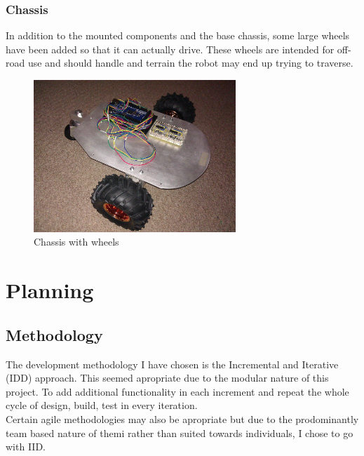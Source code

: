 \documentclass[11pt,fleqn,twoside]{article}
\begin{document}
\subsubsection{Chassis}
In addition to the mounted components and the base chassis, some large wheels have been added so that it can actually drive.  These wheels are intended for off-road use and should handle and terrain the robot may end up trying to traverse.
\begin{figure}[h]
\centering
        \includegraphics[width=3.0in] {figures/tria-mkII.jpg}
        \caption{Chassis with wheels}
        \label{Chassis with wheels}
\end{figure}


\section{Planning}
\subsection{Methodology}
The development methodology I have chosen is the Incremental and Iterative (IDD) approach.  This seemed apropriate due to the modular nature of this project.  To add additional functionality in each increment and repeat the whole cycle of design, build, test in every iteration.
\\Certain agile methodologies may also be apropriate but due to the prodominantly team based nature of themi rather than suited towards individuals, I chose to go with IID.
\end{document}
